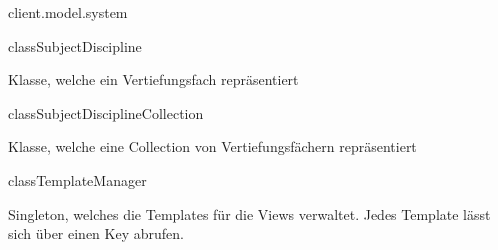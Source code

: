 \begin{texdocpackage}{client.model.system}
\begin{texdocclass}{class}{SubjectDiscipline}
\label{texdoclet:edu.kit.informatik.studyplan.client.model.system.SubjectDiscipline}
\begin{texdocclassintro}
Klasse, welche ein Vertiefungsfach repräsentiert\end{texdocclassintro}
\begin{texdocclassfields}
\end{texdocclassfields}
\begin{texdocclassconstructors}
\end{texdocclassconstructors}
\end{texdocclass}


\begin{texdocclass}{class}{SubjectDisciplineCollection}
\label{texdoclet:edu.kit.informatik.studyplan.client.model.system.SubjectDisciplineCollection}
\begin{texdocclassintro}
Klasse, welche eine Collection von Vertiefungsfächern repräsentiert\end{texdocclassintro}
\begin{texdocclassfields}
\end{texdocclassfields}
\begin{texdocclassconstructors}
\end{texdocclassconstructors}
\end{texdocclass}


\begin{texdocclass}{class}{TemplateManager}
\label{texdoclet:edu.kit.informatik.studyplan.client.model.system.TemplateManager}
\begin{texdocclassintro}
Singleton, welches die Templates für die Views verwaltet. Jedes Template
 lässt sich über einen Key abrufen.\texdocbr{}


\end{texdocclassintro}
\end{texdocclass}
\end{texdocpackage}
